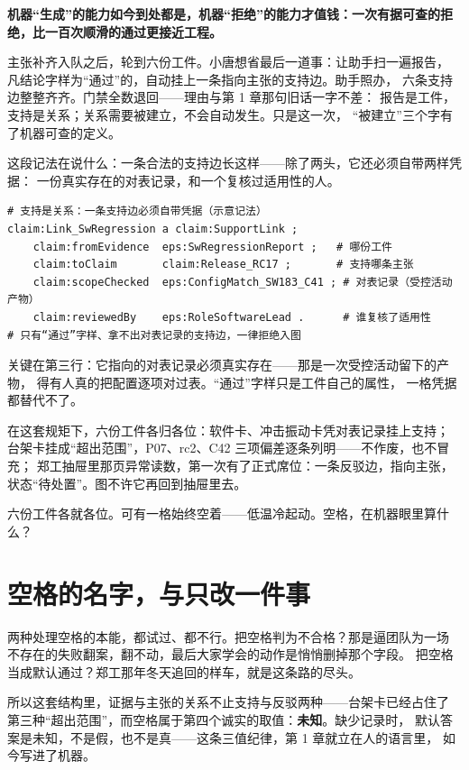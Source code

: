 \textbf{机器“生成”的能力如今到处都是，机器“拒绝”的能力才值钱：一次有据可查的拒绝，比一百次顺滑的通过更接近工程。}

主张补齐入队之后，轮到六份工件。小唐想省最后一道事：让助手扫一遍报告，
凡结论字样为“通过”的，自动挂上一条指向主张的支持边。助手照办，
六条支持边整整齐齐。门禁全数退回——理由与第 1 章那句旧话一字不差：
报告是工件，支持是关系；关系需要被建立，不会自动发生。只是这一次，
“被建立”三个字有了机器可查的定义。

这段记法在说什么：一条合法的支持边长这样——除了两头，它还必须自带两样凭据：
一份真实存在的对表记录，和一个复核过适用性的人。

\nopagebreak[4]
\begin{codebox}
\begin{Verbatim}[fontsize=\small,breaklines=true,breakanywhere=true,breaksymbolleft={},breaksymbolright={}]
# 支持是关系：一条支持边必须自带凭据（示意记法）
claim:Link_SwRegression a claim:SupportLink ;
    claim:fromEvidence  eps:SwRegressionReport ;   # 哪份工件
    claim:toClaim       claim:Release_RC17 ;       # 支持哪条主张
    claim:scopeChecked  eps:ConfigMatch_SW183_C41 ; # 对表记录（受控活动产物）
    claim:reviewedBy    eps:RoleSoftwareLead .      # 谁复核了适用性
# 只有“通过”字样、拿不出对表记录的支持边，一律拒绝入图
\end{Verbatim}
\end{codebox}

关键在第三行：它指向的对表记录必须真实存在——那是一次受控活动留下的产物，
得有人真的把配置逐项对过表。“通过”字样只是工件自己的属性，
一格凭据都替代不了。

在这套规矩下，六份工件各归各位：软件卡、冲击振动卡凭对表记录挂上支持；
台架卡挂成“超出范围”，P07、rc2、C42 三项偏差逐条列明——不作废，也不冒充；
郑工抽屉里那页异常读数，第一次有了正式席位：一条反驳边，指向主张，
状态“待处置”。图不许它再回到抽屉里去。

六份工件各就各位。可有一格始终空着——低温冷起动。空格，在机器眼里算什么？

\section{空格的名字，与只改一件事}

两种处理空格的本能，都试过、都不行。把空格判为不合格？那是逼团队为一场
不存在的失败翻案，翻不动，最后大家学会的动作是悄悄删掉那个字段。
把空格当成默认通过？郑工那年冬天追回的样车，就是这条路的尽头。

所以这套结构里，证据与主张的关系不止支持与反驳两种——台架卡已经占住了
第三种“超出范围”，而空格属于第四个诚实的取值：\textbf{未知}。缺少记录时，
默认答案是未知，不是假，也不是真——这条三值纪律，第 1 章就立在人的语言里，
如今写进了机器。

